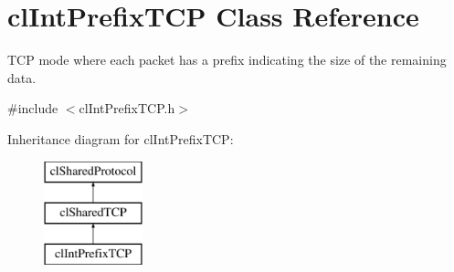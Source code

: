 \hypertarget{classcl_int_prefix_t_c_p}{
\section{clIntPrefixTCP Class Reference}
\label{classcl_int_prefix_t_c_p}
}


TCP mode where each packet has a prefix indicating the size of the remaining data.  




{\ttfamily \#include $<$clIntPrefixTCP.h$>$}

Inheritance diagram for clIntPrefixTCP:\begin{figure}[H]
\begin{center}
\leavevmode
\includegraphics[height=3.000000cm]{classcl_int_prefix_t_c_p}
\end{center}
\end{figure}
